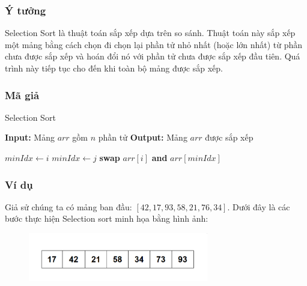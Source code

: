 \subsubsection{Ý tưởng}
Selection Sort là thuật toán sắp xếp dựa trên so sánh. Thuật toán này sắp xếp một mảng bằng cách chọn đi chọn lại phần tử nhỏ nhất (hoặc lớn nhất) từ phần chưa được sắp xếp và hoán đổi nó với phần tử chưa được sắp xếp đầu tiên. Quá trình này tiếp tục cho đến khi toàn bộ mảng được sắp xếp. \cite{brown2021selection} \cite{smith2023selection}
\subsubsection{Mã giả}

\begin{algorithm}[H]
    \caption{Selection Sort}
    \begin{algorithmic}[1]
        \State \textbf{Input:} Mảng $arr$ gồm $n$ phần tử
        \State \textbf{Output:} Mảng $arr$ được sắp xếp
        
            \State $minIdx \gets i$
                    \State $minIdx \gets j$
                \EndIf
            \EndFor
                \State \textbf{swap} $arr[i]$ \textbf{and} $arr[minIdx]$
            \EndIf
        \EndFor
    \EndProcedure
    \end{algorithmic}
    
\end{algorithm}
\newpage
\subsubsection{Ví dụ}
Giả sử chúng ta có mảng ban đầu: $[42, 17, 93, 58, 21, 76, 34]$. Dưới đây là các bước thực hiện Selection sort minh họa bằng hình ảnh:

\begin{figure}[H]
    \centering
    \includegraphics[width=0.7\textwidth]{img/selection sort/1.png}
    
\end{figure}

